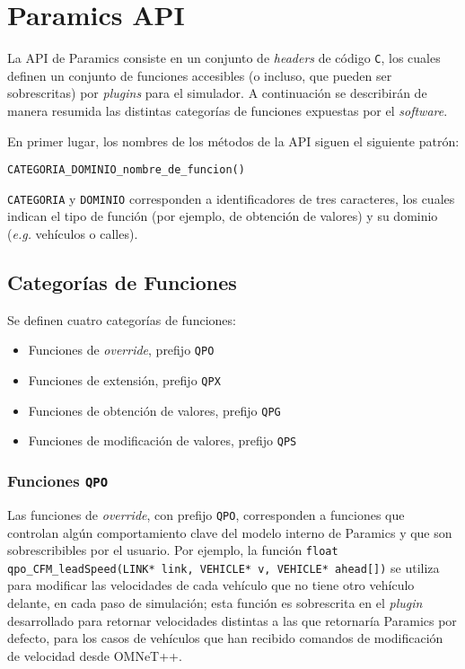 \chapter{Paramics API} \label{anex:paramics_api}

La API de Paramics consiste en un conjunto de \emph{headers} de código \texttt{C}, los cuales definen un conjunto de funciones accesibles (o incluso, que pueden ser sobrescritas) por \emph{plugins} para el simulador. A continuación se describirán de manera resumida las distintas categorías de funciones expuestas por el \emph{software}.

En primer lugar, los nombres de los métodos de la API siguen el siguiente patrón:
\begin{center}
    \texttt{CATEGORIA\_DOMINIO\_nombre\_de\_funcion()}
\end{center}

\texttt{CATEGORIA} y \texttt{DOMINIO} corresponden a identificadores de tres caracteres, los cuales indican el tipo de función (por ejemplo, de obtención de valores) y su dominio (\emph{e.g.} vehículos o calles).

\section{Categorías de Funciones}

Se definen cuatro categorías de funciones:

\begin{itemize}
    \item Funciones de \emph{override}, prefijo \texttt{QPO}
    \item Funciones de extensión, prefijo \texttt{QPX}
    \item Funciones de obtención de valores, prefijo \texttt{QPG}
    \item Funciones de modificación de valores, prefijo \texttt{QPS}
\end{itemize}

\subsection{Funciones \texttt{QPO}}

Las funciones de \emph{override}, con prefijo \texttt{QPO}, corresponden a funciones que controlan algún comportamiento clave del modelo interno de Paramics y que son sobrescribibles por el usuario. Por ejemplo, la función \texttt{float qpo\_CFM\_leadSpeed(LINK* link, VEHICLE* v, VEHICLE* ahead[])} se utiliza para modificar las velocidades de cada vehículo que no tiene otro vehículo delante, en cada paso de simulación; esta función es sobrescrita en el \emph{plugin} desarrollado para retornar velocidades distintas a las que retornaría Paramics por defecto, para los casos de vehículos que han recibido comandos de modificación de velocidad desde OMNeT++.

